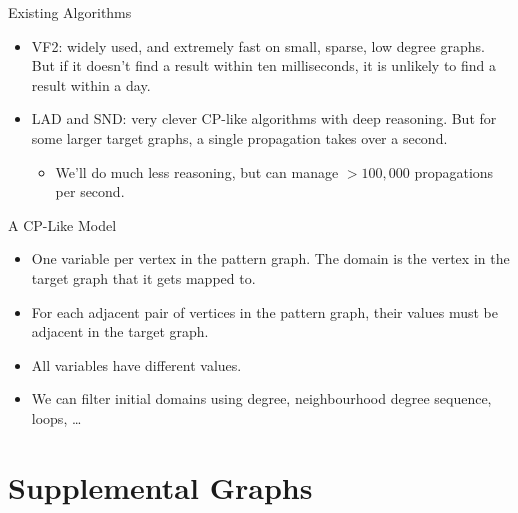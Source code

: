 \documentclass{beamer}
\begin{document}
\begin{frame}{Existing Algorithms}
    \begin{itemize}
        \item VF2: widely used, and extremely fast on small, sparse, low degree graphs. But if
            it doesn't find a result within ten milliseconds, it is unlikely to find a result
            within a day.

        \item LAD and SND: very clever CP-like algorithms with deep reasoning. But for some
            larger target graphs, a single propagation takes over a second.

            \begin{itemize}
                \item We'll do much less reasoning, but can manage $>100,000$ propagations per
                    second.
            \end{itemize}
    \end{itemize}
\end{frame}

\begin{frame}{A CP-Like Model}

    \begin{itemize}
        \item One variable per vertex in the pattern graph. The domain is the vertex in the target
            graph that it gets mapped to.

        \item For each adjacent pair of vertices in the pattern graph, their values must be adjacent
            in the target graph.

        \item All variables have different values.

        \item We can filter initial domains using degree, neighbourhood degree sequence, loops,
            \ldots
    \end{itemize}

\end{frame}

\section{Supplemental Graphs}

\frame{\sectionpage}
\end{document}
